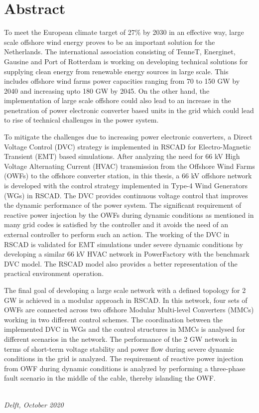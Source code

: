 \chapter*{Abstract}
To meet the European climate target of 27\% by 2030 in an effective way, large scale offshore wind energy proves to be an important solution for the Netherlands. The international association consisting of TenneT, Energinet, Gausine and Port of Rotterdam is working on developing technical solutions for supplying clean energy from renewable energy sources in large scale. This includes offshore wind farms power capacities ranging from 70 to 150 GW by 2040 and increasing upto 180 GW by 2045. On the other hand, the implementation of large scale offshore could also lead to an increase in the penetration of power electronic converter based units in the grid which could lead to rise of technical challenges in the power system.

To mitigate the challenges due to increasing power electronic converters, a Direct Voltage Control (DVC) strategy is implemented in RSCAD for Electro-Magnetic Transient (EMT) based simulations. After analyzing the need for 66 kV High Voltage Alternating Current (HVAC) transmission from the Offshore Wind Farms (OWFs) to the offshore converter station, in this thesis, a 66 kV offshore network is developed with the control strategy implemented in Type-4 Wind Generators (WGs) in RSCAD. The DVC provides continuous voltage control that improves the dynamic performance of the power system. The significant requirement of reactive power injection by the OWFs during dynamic conditions as mentioned in many grid codes is satisfied by the controller and it avoids the need of an external controller to perform such an action. The working of the DVC in RSCAD is validated for EMT simulations under severe dynamic conditions by developing a similar 66 kV HVAC network in PowerFactory with the benchmark DVC model. The RSCAD model also provides a better representation of the practical environment operation. 

The final goal of developing a large scale network with a defined topology for 2 GW is achieved in a modular approach in RSCAD. In this network, four sets of OWFs are connected across two offshore Modular Multi-level Converters (MMCs) working in two different control schemes. The coordination between the implemented DVC in WGs and the control structures in MMCs is analysed for different scenarios in the network. The performance of the 2 GW network in terms of short-term voltage stability and power flow during severe dynamic conditions in the grid is analyzed. The requirement of reactive power injection from OWF during dynamic conditions is analyzed by performing a three-phase fault scenario in the middle of the cable, thereby islanding the OWF.

\begin{flushright}
{\makeatletter\itshape
    \@author \\
    Delft, October 2020
\makeatother}
\end{flushright}


